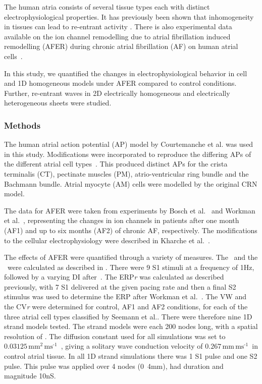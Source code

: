 The human atria consists of several tissue types each with distinct
electrophysiological properties.  It has previously been shown that
inhomogeneity in tissues can lead to re-entrant activity
\cite{Bernus2005, Coronel1992, Kumagai1997}.  There is also experimental
data available on the ion channel remodelling due to atrial
fibrillation induced remodelling (AFER) during chronic atrial
fibrillation (AF) on human atrial cells~\cite{Bosch1999,Workman2001}.

In this study, we quantified the changes in electrophysiological
behavior in cell and 1D homogeneous models under AFER compared to control
conditions.  Further, re-entrant waves in 2D electrically homogeneous
and electrically heterogeneous sheets were studied.

\subsubsection{Methods}

The human atrial action potential (AP) model by Courtemanche et
al.\cite{crn98} was used in this study.  Modifications were
incorporated to reproduce the differing APs of the different atrial cell
types~\cite{Seemann2006}.  This produced distinct APs for the
crista terminalis (CT), pectinate muscles (PM), atrio-ventricular ring
bundle and the Bachmann bundle.  Atrial myocyte (AM) cells were modelled
by the original CRN model.

The data for AFER were taken from experiments by Bosch et
al.~\cite{Bosch1999} and Workman et al.~\cite{Workman2001}, representing
the changes in ion channels in patients after one month (AF1)
and up to six months (AF2) of chronic AF, respectively.  The
modifications to the cellular electrophysiology were described in
Kharche et al.~\cite{Kharche2007}.

The effects of AFER were quantified through a variety of measures.  The
\apdr\ and the \apdr[50]\ were calculated
as described in .  There were 9 S1 stimuli at a frequency of
\unit{1}{Hz}, followed by a varying DI after~\cite{blah2009}.  The ERP\emph{r}
was calculated as described previously, with 7 S1 delivered at the given pacing
rate and then a final S2 stimulus was used to determine the ERP after Workman et
al.~\cite{Workman2001}.  The VW and the CV\emph{r} were determined for control,
AF1 and AF2 conditions, for each of the three atrial cell types classified by
Seemann et al.. There were therefore nine 1D strand models tested.  The strand
models were each 200 nodes long, with a spatial resolution of .  The
diffusion constant used for all simulations was set to
$0.03125\,\text{mm}^{\text{2}}\,\text{ms}^{\text{-1}}$~\cite{Biktasheva2005},
giving a solitary wave conduction velocity of
$0.267\,\text{mm}\,\text{ms}^{\text{-1}}$\ in control atrial tissue.  In all 1D
strand simulations there was 1 S1 pulse and one S2 pulse.  This pulse was
applied over 4 nodes (\unit{0.4}{mm}), had duration  and magnitude
\unit{10}{nS}.

